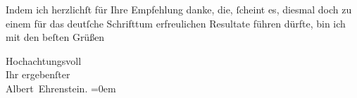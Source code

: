 \pstart
           Indem ich herzlichſt für Ihre Empfehlung danke, die, ſcheint es, diesmal doch zu
               einem für das deutſche Schrifttum erfreulichen Resultate führen dürfte, bin ich mit den beſten Grüßen\pend
           
\pstart
           Hochachtungsvoll{\\[\baselineskip]}Ihr ergebenſter{\\[\baselineskip]}\spacefill\mbox{Albert Ehrenstein.}\pend
           \leftskip=0em{}\endnumbering{}  
      